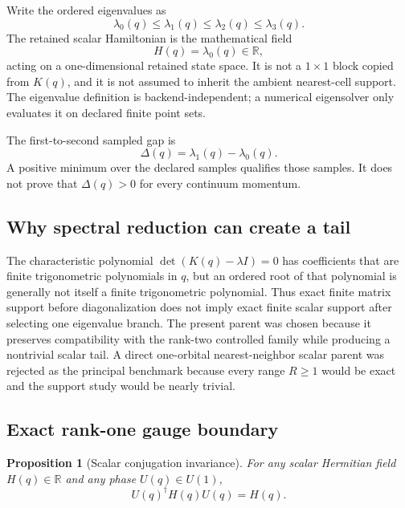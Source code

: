 \documentclass[11pt]{article}
\newtheorem{proposition}{Proposition}
\begin{document}
Write the ordered eigenvalues as
\begin{equation}
 \lambda_0(q)\le\lambda_1(q)\le\lambda_2(q)\le\lambda_3(q).
\end{equation}
The retained scalar Hamiltonian is the mathematical field
\begin{equation}
 H(q)=\lambda_0(q)\in\mathbb{R},
 \label{eq:scalar-band}
\end{equation}
acting on a one-dimensional retained state space.  It is not a $1\times1$ block copied
from $K(q)$, and it is not assumed to inherit the ambient nearest-cell support.  The
eigenvalue definition is backend-independent; a numerical eigensolver only evaluates it
on declared finite point sets.

The first-to-second sampled gap is
\begin{equation}
 \Delta(q)=\lambda_1(q)-\lambda_0(q).
\end{equation}
A positive minimum over the declared samples qualifies those samples.  It does not prove
that $\Delta(q)>0$ for every continuum momentum.

\subsection{Why spectral reduction can create a tail}

The characteristic polynomial
$\det(K(q)-\lambda I)=0$ has coefficients that are finite trigonometric polynomials in
$q$, but an ordered root of that polynomial is generally not itself a finite
trigonometric polynomial.  Thus exact finite matrix support before diagonalization does
not imply exact finite scalar support after selecting one eigenvalue branch.  The present
parent was chosen because it preserves compatibility with the rank-two controlled family
while producing a nontrivial scalar tail.  A direct one-orbital nearest-neighbor scalar
parent was rejected as the principal benchmark because every range $R\ge1$ would be
exact and the support study would be nearly trivial.

\subsection{Exact rank-one gauge boundary}

\begin{proposition}[Scalar conjugation invariance]
For any scalar Hermitian field $H(q)\in\mathbb{R}$ and any phase
$U(q)\in U(1)$,
\begin{equation}
 U(q)^{\dagger}H(q)U(q)=H(q).
 \label{eq:u1-invariance}
\end{equation}
\end{proposition}
\end{document}
